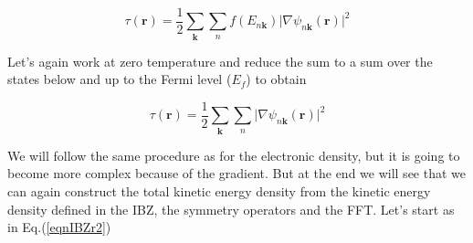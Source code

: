 \documentclass[a4paper,12pt]{report}
\begin{document}
\begin{equation}
\tau(\mathbf{r}) = \frac{1}{2} \sum_{\mathbf{k}} \sum_n f(E_{n\mathbf{k}}) \vert \nabla \psi_{n\mathbf{k}}(\mathbf{r}) \vert^2
\end{equation}

Let's again work at zero temperature and reduce the sum to a sum over the states below and up to the Fermi level ($E_f$) to obtain

\begin{equation}
\tau(\mathbf{r}) = \frac{1}{2} \sum_{\mathbf{k}} \sum_n \vert \nabla \psi_{n\mathbf{k}}(\mathbf{r}) \vert^2
\label{eqdefkden}
\end{equation}

We will follow the same procedure as for the electronic density, but it is going to become more complex because of the gradient. But at the end we will see that we can again construct the total kinetic energy density from the kinetic energy density defined in the IBZ, the symmetry operators and the FFT. Let's start as in Eq.(\ref{eqnIBZr2})
\end{document}
